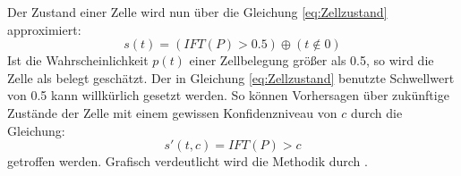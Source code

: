 Der Zustand einer Zelle wird nun über die Gleichung \ref{eq:Zellzustand} approximiert: 
\begin{equation}
	s(t) = (IFT(P) > 0.5) \oplus  (t \notin 0)
	\label{eq:Zellzustand}
\end{equation}
Ist die Wahrscheinlichkeit $p(t)$ einer Zellbelegung größer als 0.5, so wird die Zelle als belegt geschätzt.
Der in Gleichung \ref{eq:Zellzustand} benutzte Schwellwert von 0.5 kann willkürlich gesetzt werden. So können Vorhersagen über zukünftige Zustände der Zelle mit einem gewissen Konfidenzniveau von $c$ durch die Gleichung:
\begin{equation}
	s'(t,c) = IFT(P) > c
	\label{eq:Zustandsvorhersage}
\end{equation}
getroffen werden. Grafisch verdeutlicht wird die Methodik durch . 

